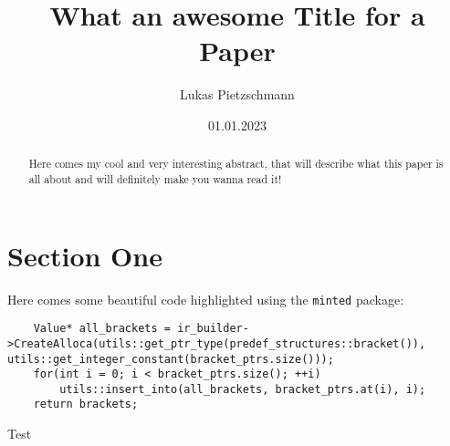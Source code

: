 \documentclass[english]{article}
\title{What an awesome Title for a Paper}
\author{Lukas Pietzschmann}
\date{01.01.2023}
\begin{document}
\maketitle

\begin{abstract}
Here comes my cool and very interesting abstract, that will describe what this paper is all about
and will definitely make you wanna read it!
\end{abstract}

\tableofcontents

\emptypage

\section{Section One}

\par
Here comes some beautiful code highlighted using the \texttt{minted} package:
\begin{listing}[H]
\begin{verbatim}
	Value* all_brackets = ir_builder->CreateAlloca(utils::get_ptr_type(predef_structures::bracket()), utils::get_integer_constant(bracket_ptrs.size()));
	for(int i = 0; i < bracket_ptrs.size(); ++i)
		utils::insert_into(all_brackets, bracket_ptrs.at(i), i);
	return brackets;
\end{verbatim}
\caption{Test}
\end{listing}

\begin{appendix}
\listoflistings
\end{appendix}
\end{document}
